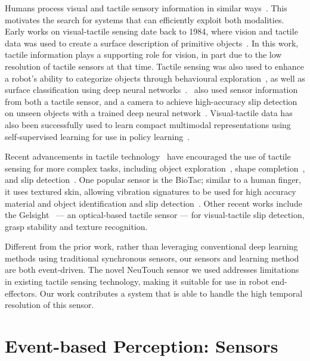 \documentclass[fyp]{socreport}
\begin{document}
Humans process visual and tactile sensory information in similar
ways~\cite{Lacey:2015}. This motivates the search for systems that can
efficiently exploit both modalities. Early works on visual-tactile sensing date
back to 1984, where vision and tactile data was used to create a surface
description of primitive objects~\cite{allenil_surfac}. In this work, tactile
information plays a supporting role for vision, in part due to the low
resolution of tactile sensors at that time. Tactile sensing was also used to
enhance a robot's ability to categorize objects through behavioural
exploration~\cite{sinapov14_learn}, as well as surface classification using deep
neural
networks~\cite{gao2016deep}.~\citeauthor{li18_slip_detec_combin_tactil_visual_infor}
also used sensor information from both a tactile sensor, and a camera to achieve
high-accuracy slip detection on unseen objects with a trained deep neural
network~\cite{li18_slip_detec_combin_tactil_visual_infor}. Visual-tactile data
has also been successfully used to learn compact multimodal representations
using self-supervised learning for use in policy learning~\cite{lee2019making}.

Recent advancements in tactile technology~\cite{shan2017robotic} have encouraged
the use of tactile sensing for more complex tasks, including object
exploration~\cite{liu2016visual}, shape completion~\cite{varley2017visual}, and
slip detection~\cite{reinecke2014experimental,calandra2018more}. One popular
sensor is the BioTac; similar to a human finger, it uses textured skin, allowing
vibration signatures to be used for high accuracy material and object
identification and slip detection~\cite{su2015force}. Other recent works include
the Gelsight~\cite{yuan2017gelsight} --- an optical-based tactile sensor --- for
visual-tactile slip detection, grasp stability and texture recognition.

Different from the prior work, rather than leveraging conventional deep learning
methods using traditional synchronous sensors, our sensors and learning method
are both event-driven. The novel NeuTouch sensor we used addresses limitations
in existing tactile sensing technology, making it suitable for use in robot
end-effectors. Our work contributes a system that is able to handle the high
temporal resolution of this sensor.

\section{Event-based Perception: Sensors}
\end{document}
